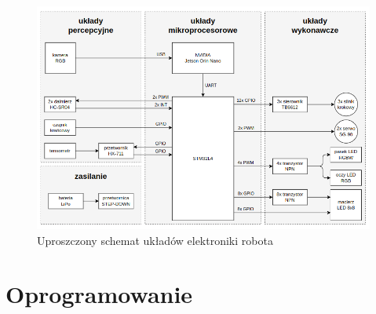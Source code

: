 \documentclass{article}
\begin{document}
        \begin{figure}[p]
            \centering
            \includegraphics[width=\textwidth]{figures/elektronika_schemat.png}
            \caption{Uproszczony schemat układów elektroniki robota}
            \label{elektronika_schemat}
        \end{figure}

    \section{Oprogramowanie}
\end{document}
